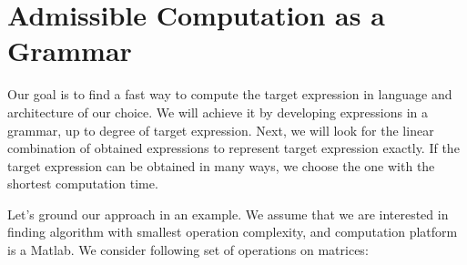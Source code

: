 \section{Admissible Computation as a Grammar}\label{sec:grammars}

Our goal is to find a fast way to compute the target expression in
language and architecture of our choice. We will achieve it by
developing expressions in a grammar, up to degree of target
expression. Next, we will look for the linear combination of obtained
expressions to represent target expression exactly. If the target expression
can be obtained in many ways, we choose the one with the shortest computation time.

Let's ground our approach in an example. We assume that we are interested in
finding algorithm with smallest operation complexity, and computation platform
is a Matlab. We consider following set of operations on matrices: 



